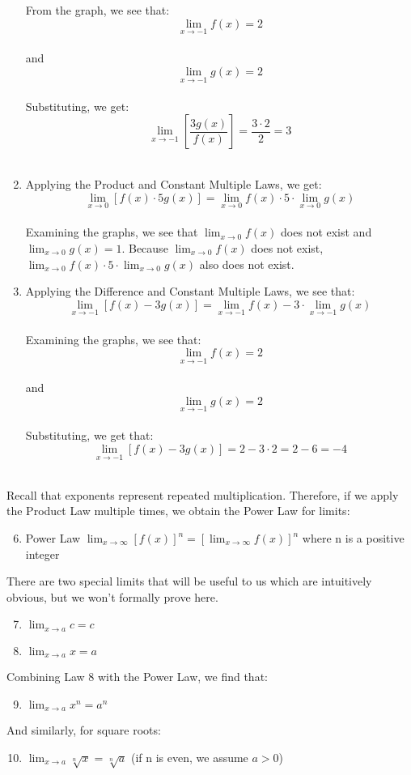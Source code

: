 \begin{Answer}
\begin{enumerate}
        From the graph, we see that: 
        $$\lim_{x\to-1}f(x) = 2$$\\
        and 
        $$\lim_{x\to-1}g(x) = 2$$\\ 
        Substituting, we get: 
        $$\lim_{x\to-1} \left[\frac{3g(x)}{f(x)}\right]=\frac{3 \cdot 2}{2}=3$$\\
        \item Applying the Product and Constant Multiple Laws, we get: 
        $$\lim_{x\to0}\left[f(x) \cdot 5g(x)\right] = \lim_{x\to0}f(x) \cdot 5 \cdot \lim_{x\to0}g(x)$$\\
        Examining the graphs, we see that $\lim_{x\to0}f(x)$ does not exist and 
        $\lim_{x\to0}g(x) = 1$. Because $\lim_{x\to0}f(x)$ does not exist, 
        $\lim_{x\to0}f(x) \cdot 5 \cdot \lim_{x\to0}g(x)$ also does not exist. 
        \item Applying the Difference and Constant Multiple Laws, we see that: 
        $$\lim_{x\to-1} \left[f(x) - 3g(x)\right] =\lim_{x\to-1}f(x) - 3 \cdot \lim_{x\to-1}g(x)$$ \\
        Examining the graphs, we see that: 
        $$\lim_{x\to-1}f(x) = 2$$\\ 
        and 
        $$\lim_{x\to-1}g(x) = 2$$\\ 
        Substituting, we get that: 
        $$\lim_{x\to-1} \left[f(x) - 3g(x)\right] =2 - 3 \cdot 2 = 2-6 = -4$$\\
    \end{enumerate}
\end{Answer}


Recall that exponents represent repeated multiplication. Therefore, if we apply the 
Product Law multiple times, we obtain the Power Law for limits:
\begin{enumerate}
    \setcounter{enumi}{5}
    \item Power Law $\lim_{x \to \infty} \left[ f(x) \right]^n = \left[ 
    \lim_{x \to \infty} f(x) \right]^n$ where n is a positive integer
\end{enumerate}
There are two special limits that will be useful to us which are intuitively 
obvious, but we won't formally prove here.  
\begin{enumerate}
    \setcounter{enumi}{6}
    \item $\lim_{x\to a} \textit{c} = \textit{c}$
    \item $\lim_{x\to a} x = a$
\end{enumerate}
Combining Law 8 with the Power Law, we find that:
\begin{enumerate}
\setcounter{enumi}{8}
    \item $\lim_{x\to a} x^n = a^n$
\end{enumerate}
And similarly, for square roots:
\begin{enumerate}
    \setcounter{enumi}{9}
    \item $\lim_{x\to a} \sqrt[n]{x} = \sqrt[n]{a}$ (if n is even, we assume $a > 0$)
\end{enumerate}

